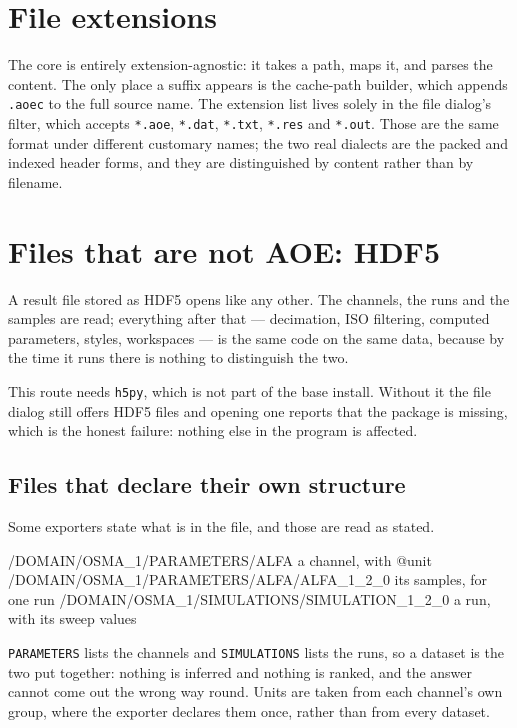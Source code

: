 \documentclass[11pt,a4paper,oneside]{report}
\newcommand{\code}[1]{\texttt{#1}}
\begin{document}
\section{File extensions}

The core is entirely extension-agnostic: it takes a path, maps it, and parses the
content. The only place a suffix appears is the cache-path builder, which appends
\code{.aoec} to the full source name. The extension list lives solely in the file
dialog's filter, which accepts \code{*.aoe}, \code{*.dat}, \code{*.txt},
\code{*.res} and \code{*.out}. Those are the same format under different
customary names; the two real dialects are the packed and indexed header forms,
and they are distinguished by content rather than by filename.

\section{Files that are not AOE: HDF5}
\label{sec:hdf5}

A result file stored as HDF5 opens like any other. The channels, the runs and
the samples are read; everything after that --- decimation, ISO filtering,
computed parameters, styles, workspaces --- is the same code on the same data,
because by the time it runs there is nothing to distinguish the two.

This route needs \code{h5py}, which is not part of the base install. Without it
the file dialog still offers HDF5 files and opening one reports that the package
is missing, which is the honest failure: nothing else in the program is
affected.

\subsection*{Files that declare their own structure}

Some exporters state what is in the file, and those are read as stated.

\begin{aoecode}
/DOMAIN/OSMA_1/PARAMETERS/ALFA               a channel, with @unit
/DOMAIN/OSMA_1/PARAMETERS/ALFA/ALFA_1_2_0    its samples, for one run
/DOMAIN/OSMA_1/SIMULATIONS/SIMULATION_1_2_0  a run, with its sweep values
\end{aoecode}

\code{PARAMETERS} lists the channels and \code{SIMULATIONS} lists the runs, so
a dataset is the two put together: nothing is inferred and nothing is ranked,
and the answer cannot come out the wrong way round. Units are taken from each
channel's own group, where the exporter declares them once, rather than from
every dataset.
\end{document}
